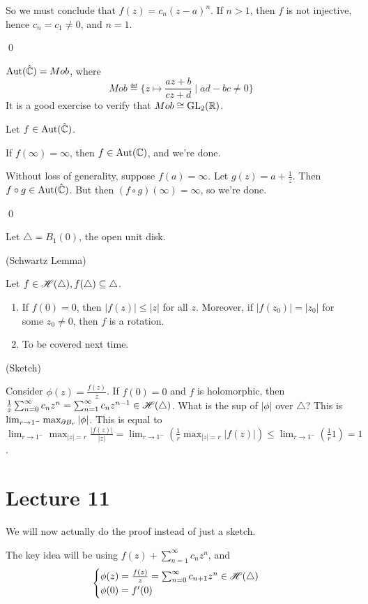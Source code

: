 \documentclass[x11names,reqno,14pt]{extarticle}
\newcommand{\oo}{{\infty}}
\begin{document}
So we must conclude that $f(z) = c_n(z - a)^n$. If $n > 1$, then $f$ is not injective, hence $c_n = c_1\neq0$, and $n = 1$. 

\qed

\thm

${\mathrm{Aut}}(\hat{\mathbb{C}}) = Mob$, where
\[
Mob \eqdef \{z\mapsto\frac{az + b}{cz + d} \mid ad - bc \neq0\}
\] 
It is a good exercise to verify that $Mob \cong {\mathrm{GL}}_2(\mathbb{R})$. 

\proof

Let $f \in {\mathrm{Aut}}(\hat{\mathbb{C}})$. 

If $f(\oo) = \oo$, then $f \in {\mathrm{Aut}}(\mathbb{C})$, and we're done. 

Without loss of generality, suppose $f(a)=\oo$. Let $g(z) = a + \frac{1}{z}$. Then $f \circ g \in {\mathrm{Aut}}(\hat{\mathbb{C}})$. But then $(f\circ g)(\oo)=\oo$, so we're done. 

\qed

Let $\bigtriangleup = B_1(0)$, the open unit disk. 

\lem (Schwartz Lemma)

Let $f \in \mathscr{H}(\bigtriangleup), f(\bigtriangleup)\subseteq \bigtriangleup$. 
\begin{enumerate}
\item If $f(0) = 0$, then $|f(z)| \leq |z|$ for all $z$. Moreover, if $|f(z_0)| = |z_0|$ for some $z_0\neq0$, then $f$ is a rotation. 
\item To be covered next time.
\end{enumerate}

\proof (Sketch)

Consider $\phi(z) = \frac{f(z)}{z}$. If $f(0) = 0$ and $f$ is holomorphic, then $\frac{1}{z}\sum_{n=0}^\oo c_nz^n = \sum_{n=1}^\oo c_nz^{n - 1}\in\ms{H}(\bigtriangleup)$. What is the sup of $|\phi|$ over $\bigtriangleup$? This is $\lim _{r\to1^-}\max_{\partial B_r}|\phi|$. This is equal to $\lim_{r\to1^-}\max_{|z| = r}\frac{|f(z)|}{|z|} = \lim_{r\to1^-}(\frac{1}{r}\max_{|z| = r}|f(z)|) \leq \lim_{r\to1^-}(\frac{1}{r}1) = 1$. 

\section*{Lecture 11}

We will now actually do the proof instead of just a sketch. 

\proof

The key idea will be using $f(z) + \sum_{n=1}^\oo c_nz^n$, and
\[
\begin{cases} \phi(z) = \frac{f(z)}{z} = \sum_{n=0}^\oo c_{n + 1}z^n \in \ms{H}(\bigtriangleup) \\
\phi(0) = f'(0) \\ 
\end{cases}
\]
\end{document}
